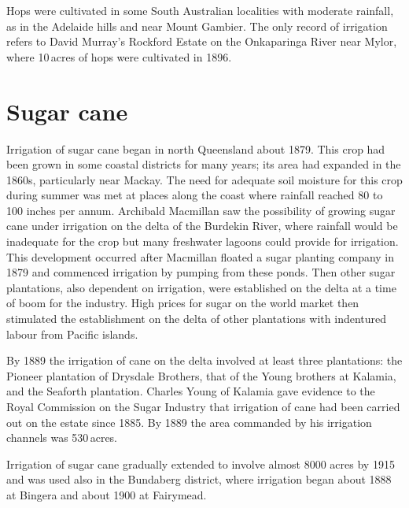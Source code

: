Hops were cultivated in some South Australian localities with moderate
rainfall, as in the Adelaide hills and near Mount
Gambier.  The only record of irrigation
refers to David Murray's   Rockford Estate on the
Onkaparinga River  near Mylor,  where 10\,acres of hops were cultivated in
1896.

\section*{Sugar cane} 

Irrigation of sugar cane began in north Queensland about 1879.  This
crop had been grown in some coastal districts for many years; its area
had expanded in the 1860s, particularly near Mackay.  The need for adequate soil moisture for this crop during summer
was met at places along the coast where rainfall reached 80 to 100
inches per annum.  Archibald Macmillan  saw the
possibility of growing sugar cane under irrigation on the delta of the
Burdekin River,  where rainfall would be
inadequate for the crop but many freshwater lagoons could provide for
irrigation.  This development occurred after Macmillan floated a sugar
planting company in 1879 and commenced irrigation by pumping from
these ponds.  Then other sugar plantations, also dependent on
irrigation, were established on the delta at a time of boom for the
industry.  High prices for sugar on the world market then stimulated
the establishment on the delta of other plantations with indentured
labour from Pacific islands.

By 1889 the irrigation of cane on the delta involved at least three
plantations: the Pioneer plantation of Drysdale Brothers,
 that of the Young brothers at Kalamia,
 and the Seaforth plantation.  Charles Young
 of Kalamia gave evidence to the Royal Commission on the Sugar
Industry that irrigation of cane had been carried out on the estate
since 1885. By 1889 the area commanded by his irrigation
channels was 530\,acres.

Irrigation of sugar cane gradually extended to involve almost 8000
acres by 1915 and was used also in the Bundaberg  district, where irrigation began about 1888
at Bingera  and about 1900 at
Fairymead.

